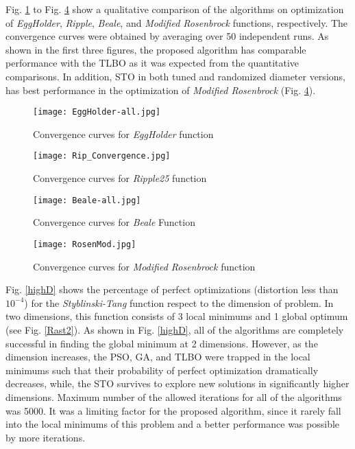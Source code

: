 \documentclass[conference]{IEEEtran}
\begin{document}
Fig. \ref{kual1} to Fig. \ref{sty} show a qualitative comparison of the algorithms on optimization of \emph{EggHolder}, \emph{Ripple}, \emph{Beale}, and \emph{Modified Rosenbrock} functions, respectively. The convergence curves were obtained by averaging over 50 independent runs. As shown in the first three figures, the proposed algorithm has comparable performance with the TLBO as it was expected from the quantitative comparisons. In addition, STO in both tuned and randomized diameter versions, has best performance in the optimization of \emph{Modified Rosenbrock} (Fig. \ref{sty}).

\begin{figure}[h!]
 \centering
  \texttt{[image: EggHolder-all.jpg]}
  \caption{Convergence curves for \emph{EggHolder} function}
  \label{kual1}
\end{figure}

\begin{figure}[h!]
 \centering
  \texttt{[image: Rip\_Convergence.jpg]}
  \caption{Convergence curves for \emph{Ripple25} function}
  \label{rip}
\end{figure}

\begin{figure}[h!]
 \centering
  \texttt{[image: Beale-all.jpg]}
  \caption{Convergence curves for \emph{Beale} Function}
  \label{kua2}
\end{figure}

\begin{figure}[h!]
 \centering
  \texttt{[image: RosenMod.jpg]}
  \caption{Convergence curves for \emph{Modified Rosenbrock} function}
  \label{sty}
\end{figure}

Fig. \ref{highD} shows the percentage of perfect optimizations (distortion less than $10^{-4}$) for the \emph{Styblinski-Tang} function respect to the dimension of problem. In two dimensions, this function consists of 3 local minimums and 1 global optimum (see Fig. \ref{Rast2}). As shown in Fig. \ref{highD}, all of the algorithms are completely successful in finding the global minimum at 2 dimensions. However, as the dimension increases, the PSO, GA, and TLBO were trapped in the local minimums such that their probability of perfect optimization dramatically decreases, while, the STO survives to explore new solutions in significantly higher dimensions. Maximum number of the allowed iterations for all of the algorithms was 5000. It was a limiting factor for the proposed algorithm, since it rarely fall into the local minimums of this problem and a better performance was possible by more iterations.
\end{document}
